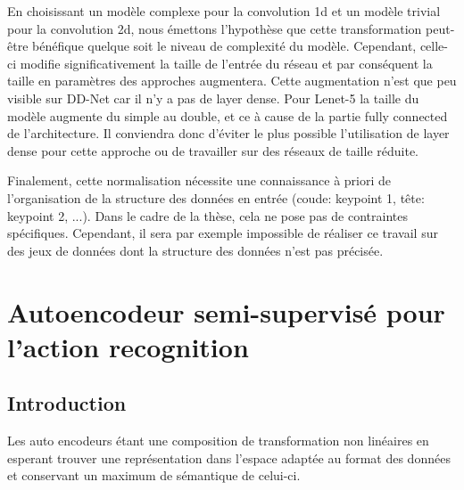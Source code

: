 En choisissant un modèle complexe pour la convolution 1d et un modèle trivial pour la convolution 2d, nous émettons l'hypothèse que cette transformation peut-être bénéfique quelque soit le niveau de complexité du modèle. Cependant, celle-ci modifie significativement la taille de l'entrée du réseau et par conséquent la taille en paramètres des approches augmentera. Cette augmentation n'est que peu visible sur DD-Net car il n'y a pas de layer dense. Pour Lenet-5 la taille du modèle augmente du simple au double, et ce à cause de la partie fully connected de l'architecture. Il conviendra donc d'éviter le plus possible l'utilisation de layer dense pour cette approche ou de travailler sur des réseaux de taille réduite.

Finalement, cette normalisation nécessite une connaissance à priori de l'organisation de la structure des données en entrée (coude: keypoint 1, tête: keypoint 2, ...). Dans le cadre de la thèse, cela ne pose pas de contraintes spécifiques. Cependant, il sera par exemple impossible de réaliser ce travail sur des jeux de données dont la structure des données n'est pas précisée.

\section{Autoencodeur semi-supervisé pour l'action recognition}
\label{refAEmod}

\subsection{Introduction}
Les auto encodeurs étant une composition de transformation non linéaires en esperant trouver une représentation dans l'espace adaptée au format des données et conservant un maximum de sémantique de celui-ci.

